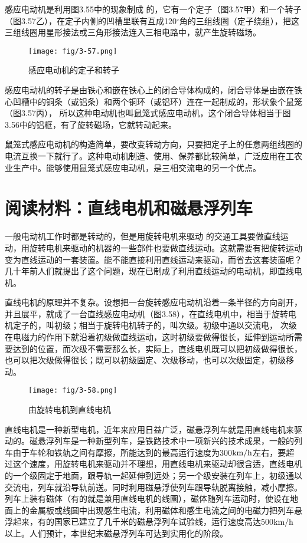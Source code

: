 感应电动机是利用图3.55中的现象制成
的，它有一个定子（图3.57甲）和一个转子（图3.57乙），在定子内侧的凹槽里联有互成120$^\circ$角的三组线圈（定子绕组），把这三组线圈用星形接法或三角形接法连入三相电路中，就产生旋转磁场。
\begin{figure}[htp]\centering
\texttt{[image: fig/3-57.png]}
\caption{感应电动机的定子和转子}
\end{figure}

感应电动机的转子是由铁心和嵌在铁心上的闭合导体构成的，闭合导体是由嵌在铁心凹槽中的铜条（或铝条）和两个铜环（或铝环）连在一起制成的，形状象个鼠笼（图3.57丙），
所以这种电动机也叫鼠笼式感应电动机，这个闭合导体相当于图3.56中的铝框，有了旋转磁场，它就转动起来。

鼠笼式感应电动机的构造简单，要改变转动方向，只要把定子上的任意两组线圈的电流互换一下就行了。这种电动机制造、使用、保养都比较简单，广泛应用在工农业生产中。能够使用鼠笼式感应电动机，是三相交流电的另一个优点。

\section*{阅读材料：直线电机和磁悬浮列车}

一般电动机工作时都是转动的，但是用旋转电机来驱动
的交通工具要做直线运动，用旋转电机来驱动的机器的一些部件也要做直线运动。这就需要有把旋转运动变为直线运动的一套装置。能不能直接利用直线运动来驱动，而省去这套装置呢？几十年前人们就提出了这个问题，现在已制成了利用直线运动的电动机，即直线电机。

直线电机的原理并不复杂。设想把一台旋转感应电动机沿着一条半径的方向剖开，并且展平，就成了一台直线感应电动机（图3.58），在直线电机中，相当于旋转电机定子的，叫初级；相当于旋转电机转子的，叫次级。初级中通以交流电，
次级在电磁力的作用下就沿着初级做直线运动，这时初级要做得很长，延伸到运动所需要达到的位置，而次级不需要那么长，实际上，直线电机既可以把初级做得很长，也可以把次级做得很长；既可以初级固定、次级移动，也可以次级固定，初级移动。
\begin{figure}[htp]\centering
\texttt{[image: fig/3-58.png]}
\caption{由旋转电机到直线电机}
\end{figure}

直线电机是一种新型电机，近年来应用日益广泛，磁悬浮列车就是用直线电机来驱动的。磁悬浮列车是一种新型列车，是铁路技术中一项新兴的技术成果，一般的列车由于车轮和铁轨之间有摩擦，所能达到的最高运行速度为300$\text{km}/\text{h}$左右，要超过这个速度，用旋转电机来驱动并不理想，用直线电机来驱动却很含适，直线电机的一个级固定于地面，跟导轨一起延伸到远处；另一个级安装在列车上，初级通以交流电，列车就沿导轨前送。同时利用磁悬浮使列车跟导轨脱离接触，减小摩擦。列车上装有磁体（有的就是兼用直线电机的线園），磁体随列车运动时，使设在地面上的金属板或线圆中出现感生电流，利用磁体和感生电流之间的电磁力把列车悬浮起来，有的国家已建立了几千米的磁悬浮列车试验线，运行速度高达500$\text{km}/\text{h}$以上。人们预计，本世纪末磁悬浮列车可达到实用化的阶段。

